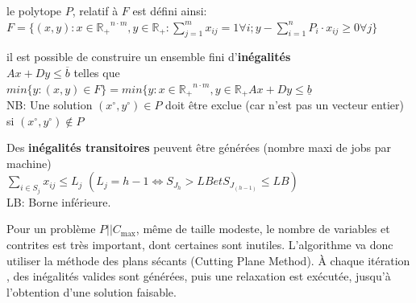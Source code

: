 \documentclass[a4paper,12pt]{report}
\theoremstyle{plain}				%
\theoremstyle{definition}				%
\newcommand\problemGrahamP{$P||C_{\max}$}
\begin{document}
\bigskip
le polytope $P$, relatif à $F$ est défini ainsi: \\
$F=\{ (x,y) : x \in \mathbb{R_+}^{n \cdot m}, y \in \mathbb{R_+} : \sum_{j=1}^{m} x_{ij}=1 \forall i;
y-\sum_{i=1}^{n} P_i \cdot x_{ij} \geq 0 \forall j	\}$

\bigskip
il est possible de construire un ensemble fini d'\textbf{inégalités} \\
$Ax+Dy \leq \overline{b}$ telles que \\
$min \{y : (x,y) \in F \} = min \{y : x \in \mathbb{R_+}^{n \cdot m}, y \in \mathbb{R_+} Ax+Dy \leq \underline{b}$ \\
NB: Une solution $(x \ensuremath{^\circ} , y\ensuremath{^\circ}) \in P$ doit être exclue (car n'est pas un vecteur entier) si $(x\ensuremath{^\circ}, y\ensuremath{^\circ}) \notin P $

\bigskip
Des \textbf{inégalités transitoires} peuvent être générées (nombre maxi de jobs par machine) \\
$\sum_{i \in S_j} x_{ij} \leq L_j$ \quad $(L_j = h-1 \iff S_{J_h} > LB et S_{J_{(h-1)}} \leq LB)$\\
LB: Borne inférieure.

\bigskip

Pour un problème \problemGrahamP, même de taille modeste, le nombre de
variables et contrites est très important, dont certaines sont
inutiles.
L'algorithme va donc utiliser la méthode des plans sécants (Cutting
Plane Method).
\`A chaque itération , des inégalités valides sont générées, puis une
relaxation est exécutée, jusqu'à l'obtention d'une solution faisable.
\end{document}
